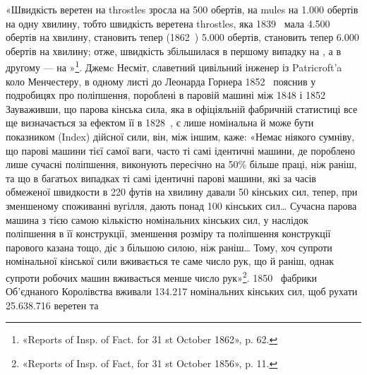 «Швидкість веретен на throstles зросла на 500 обертів, на
mules на \num{1.000} обертів на одну хвилину, тобто швидкість веретена
throstles, яка 1839~ мала \num{4.500} обертів на хвилину, становить
тепер (1862~) \num{5.000} обертів, становить тепер \num{6.000} обертів на хвилину; отже,
швидкість збільшилася в першому випадку на , а в другому —
на »\footnote{
«Reports of Insp. of Fact. for 31 st October 1862», p. 62.
}. Джемc Несміт, славетний цивільний інженер із
Patricroft’a коло Менчестеру, в одному листі до Леонарда Горнера
1852~ пояснив у подробицях про поліпшення, пороблені в паровій
машині між 1848 і 1852~ Зауваживши, що парова кінська
сила, яка в офіціяльній фабричній статистиці все ще визначається
за ефектом її в 1828~, є лише номінальна й може бути
показником (Index) дійсної сили, він, між іншим, каже:
«Немає ніякого сумніву, що парові машини тієї самої ваги, часто
ті самі ідентичні машини, де пороблено лише сучасні поліпшення,
виконують пересічно на 50\% більше праці, ніж раніш, та що в
багатьох випадках ті самі ідентичні парові машини, які за часів
обмеженої швидкости в 220 футів на хвилину давали 50 кінських
сил, тепер, при зменшеному споживанні вугілля, дають понад 100
кінських сил\dots{} Сучасна парова машина з тією самою кількістю
номінальних кінських сил, у наслідок поліпшення в її конструкції,
зменшення розміру та поліпшення конструкції парового
казана тощо, діє з більшою силою, ніж раніш\dots{} Тому, хоч супроти
номінальної кінської сили вживається те саме число рук, що й
раніш, однак супроти робочих машин вживається менше число
рук»\footnote{
«Reports of Insp. of Fact, for 31 st October 1856», p. 11.
}. 1850~ фабрики Об’єднаного Королівства вживали \num{134.217}
номінальних кінських сил, щоб рухати \num{25.638.716} веретен та

